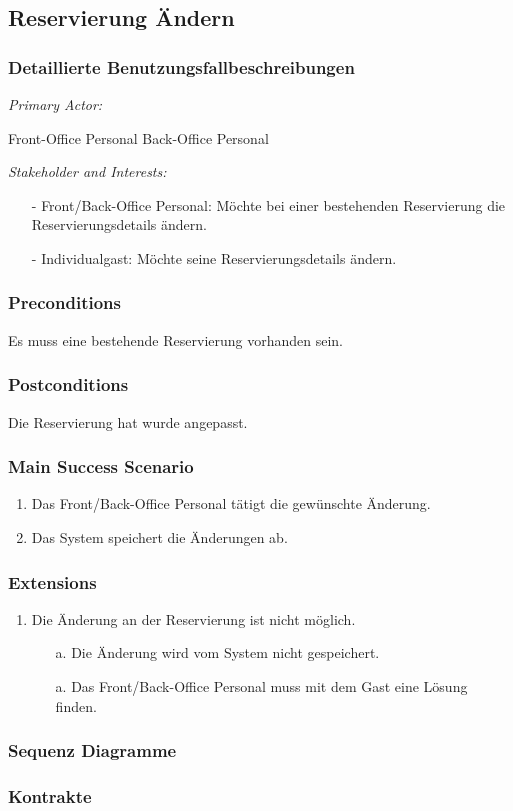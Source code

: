 \documentclass[./detailed_overview_usecases.tex]{subfiles}
\begin{document}
    \subsection{Reservierung Ändern}
    \subsubsection{Detaillierte Benutzungsfallbeschreibungen}
    \textit{Primary Actor:}
    \begin{enumerate}
        Front-Office Personal
        Back-Office Personal
    \end{enumerate}
    \textit{Stakeholder and Interests:}
    \begin{itemize}
        \item[-] Front/Back-Office Personal: Möchte bei einer bestehenden Reservierung die Reservierungsdetails ändern.
        \item[-] Individualgast: Möchte seine Reservierungsdetails ändern.
    \end{itemize}

    \subsubsection*{Preconditions}
    Es muss eine bestehende Reservierung vorhanden sein.

    \subsubsection*{Postconditions}
    Die Reservierung hat wurde angepasst.

    \subsubsection*{Main Success Scenario}
    \begin{enumerate}
        \item Das Front/Back-Office Personal tätigt die gewünschte Änderung.
        \item Das System speichert die Änderungen ab.
    \end{enumerate}

    \subsubsection*{Extensions}
    \begin{enumerate}
        \item Die Änderung an der Reservierung ist nicht möglich.
        \begin{itemize}
            \item[a.] Die Änderung wird vom System nicht gespeichert.
            \item[a.] Das Front/Back-Office Personal muss mit dem Gast eine Lösung finden.
        \end{itemize}
    \end{enumerate}
    \subsubsection{Sequenz Diagramme}
    \subsubsection{Kontrakte}
\end{document}
